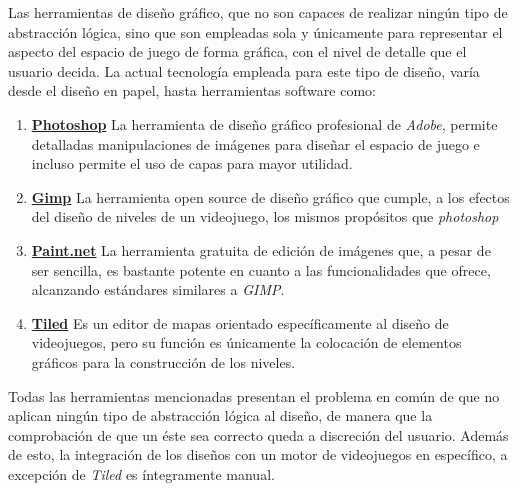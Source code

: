 Las herramientas de diseño gráfico, que no son capaces de realizar ningún tipo de abstracción lógica, sino que son empleadas sola y únicamente para representar el aspecto del espacio de juego de forma gráfica, con el nivel de detalle que el usuario decida.
La actual tecnología empleada para este tipo de diseño, varía desde el diseño en papel, hasta herramientas software como:
\begin{enumerate}
	\item \textbf{\href{https://www.photoshop.com/}{Photoshop}} La herramienta de diseño gráfico profesional de \textit{Adobe}, permite detalladas manipulaciones de imágenes para diseñar el espacio de juego e incluso permite el uso de capas para mayor utilidad.
	\item \textbf{\href{https://www.gimp.org/}{Gimp}} La herramienta open source de diseño gráfico que cumple, a los efectos del diseño de niveles de un videojuego, los mismos propósitos que \textit{photoshop}
	\item \textbf{\href{https://www.getpaint.net/}{Paint.net}} La herramienta gratuita de edición de imágenes que, a pesar de ser sencilla, es bastante potente en cuanto a las funcionalidades que ofrece, alcanzando estándares similares a \textit{GIMP}.
	\item \textbf{\href{https://www.mapeditor.org/}{Tiled}} Es un editor de mapas orientado específicamente al diseño de videojuegos, pero su función es únicamente la colocación de elementos gráficos para la construcción de los niveles.
\end{enumerate}
Todas las herramientas mencionadas presentan el problema en común de que no aplican ningún tipo de abstracción lógica al diseño, de manera que la comprobación de que un éste sea correcto queda a discreción del usuario.
Además de esto, la integración de los diseños con un motor de videojuegos en específico, a excepción de \textit{Tiled} es íntegramente manual.